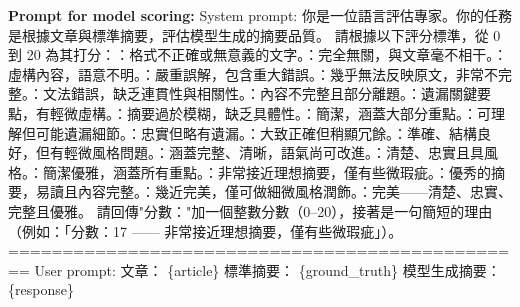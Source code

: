 \documentclass[preprint,12pt]{elsarticle}
\begin{document}
\noindent
\textbf{Prompt for model scoring:}\newline
{
\small
\noindent
System prompt:\newline
你是一位語言評估專家。你的任務是根據文章與標準摘要，評估模型生成的摘要品質。\newline
請根據以下評分標準，從 0 到 20 為其打分：：格式不正確或無意義的文字。：完全無關，與文章毫不相干。：虛構內容，語意不明。：嚴重誤解，包含重大錯誤。：幾乎無法反映原文，非常不完整。：文法錯誤，缺乏連貫性與相關性。：內容不完整且部分離題。：遺漏關鍵要點，有輕微虛構。：摘要過於模糊，缺乏具體性。：簡潔，涵蓋大部分重點。：可理解但可能遺漏細節。：忠實但略有遺漏。：大致正確但稍顯冗餘。：準確、結構良好，但有輕微風格問題。：涵蓋完整、清晰，語氣尚可改進。：清楚、忠實且具風格。：簡潔優雅，涵蓋所有重點。：非常接近理想摘要，僅有些微瑕疵。：優秀的摘要，易讀且內容完整。：幾近完美，僅可做細微風格潤飾。：完美——清楚、忠實、完整且優雅。\newline
請回傳"分數："加一個整數分數（0–20），接著是一句簡短的理由（例如：「分數：17 —— 非常接近理想摘要，僅有些微瑕疵」）。\newline
================================================\newline
User prompt:\newline
文章：\newline
\{article\}\newline
\noindent
標準摘要：\newline
\{ground\_truth\}\newline
\noindent
模型生成摘要：\newline
\{response\}\newline
\newline
}
\end{document}
